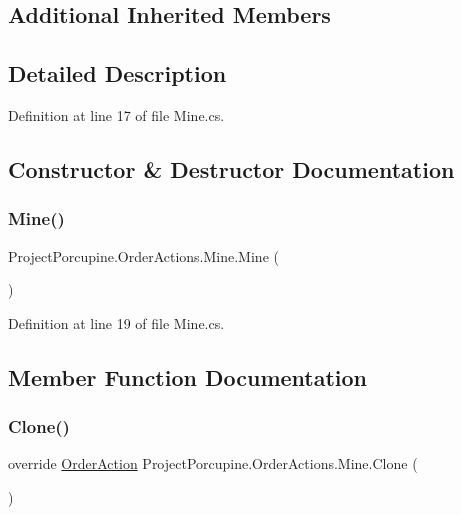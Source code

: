\subsection*{Additional Inherited Members}


\subsection{Detailed Description}


Definition at line 17 of file Mine.\+cs.



\subsection{Constructor \& Destructor Documentation}
\mbox{\label{class_project_porcupine_1_1_order_actions_1_1_mine_a591ac35ae1e70e92f5376b804225479e}} 
\subsubsection{\texorpdfstring{Mine()}{Mine()}}
{\footnotesize\ttfamily Project\+Porcupine.\+Order\+Actions.\+Mine.\+Mine (\begin{DoxyParamCaption}{ }\end{DoxyParamCaption})}



Definition at line 19 of file Mine.\+cs.



\subsection{Member Function Documentation}
\mbox{\label{class_project_porcupine_1_1_order_actions_1_1_mine_a8c32c9b50a98edd3db04182f1e3c5b53}} 
\subsubsection{\texorpdfstring{Clone()}{Clone()}}
{\footnotesize\ttfamily override \hyperlink{class_project_porcupine_1_1_order_actions_1_1_order_action}{Order\+Action} Project\+Porcupine.\+Order\+Actions.\+Mine.\+Clone (\begin{DoxyParamCaption}{ }\end{DoxyParamCaption})\hspace{0.3cm}{\ttfamily [virtual]}}



